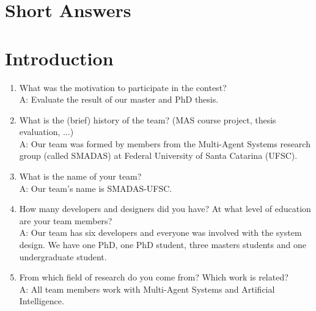 \section*{Short Answers}

\appendix

\section{Introduction}

\begin{enumerate}
\item What was the motivation to participate in the contest?\\
	A: Evaluate the result of our master and PhD thesis.


\item  What is the (brief) history of the team? (MAS course project,  thesis evaluation, $\ldots$) \\
	A: Our team was formed by members from the Multi-Agent Systems research group (called SMADAS) at Federal University of Santa Catarina (UFSC). %

\item  What is the name of your team?\\
	A: Our team's name is SMADAS-UFSC.%

\item  How many developers and designers did you have? At what level of education are your team members? \\
	A: Our team has six developers and everyone was involved with the system design. We have one PhD, one PhD student, three masters students and one undergraduate student. %

\item  From which field of research do you come from? Which work is related?\\
	A: All team members work with Multi-Agent Systems and Artificial Intelligence. %

\end{enumerate}

